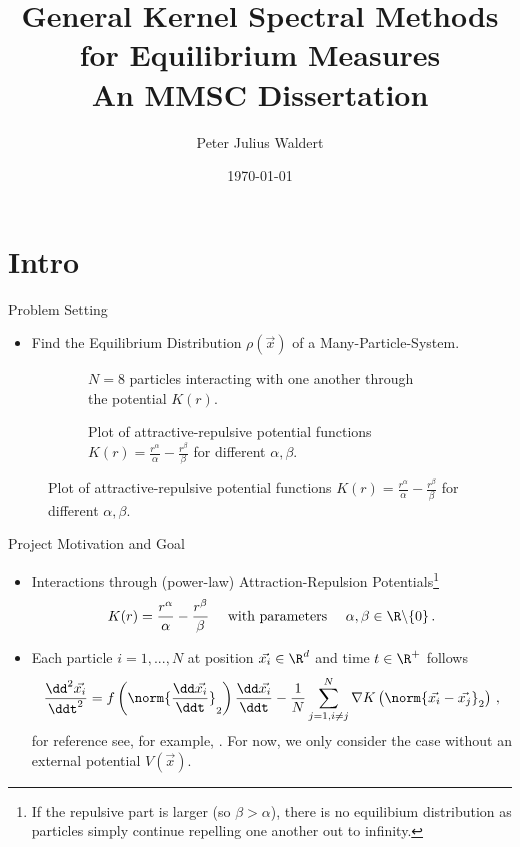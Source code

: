 \documentclass[aspectratio=169, hyperref={colorlinks=true}]{beamer}
\title{General Kernel Spectral Methods for Equilibrium Measures \\ \normalsize An MMSC Dissertation}
\author{Peter Julius Waldert}
\institute{Mathematical Institute \\ University of Oxford}
\date{\today}
\begin{document}
  {\frame{\titlepage}}

  \section{Intro}
  \begin{frame}{Problem Setting}
    \begin{itemize}
      \item Find the Equilibrium Distribution $\rho(\vec{x})$ of a Many-Particle-System.
    \end{itemize}
    \begin{figure}[H]
      \centering
      \begin{subfigure}[t]{0.5\textwidth}
        \centering
        \caption*{$N = 8$ particles interacting with one another through the potential $K(r)$.}
      \end{subfigure}
      \hfill
      \begin{subfigure}[t]{0.49\textwidth}
        \centering
        \caption*{Plot of attractive-repulsive potential functions $K(r) = \frac{r^\alpha}{\alpha} - \frac{r^\beta}{\beta}$ for different $\alpha, \beta$.}
      \end{subfigure}
    \end{figure}
  \end{frame}

  {
  \begin{frame}{Project Motivation and Goal}
    \vspace{0.4cm}
    \begin{itemize}
      \item Interactions through (power-law) Attraction-Repulsion Potentials\footnote{If the repulsive part is larger (so $\beta > \alpha$), there is no equilibium distribution as particles simply continue repelling one another out to infinity.}
            $$K(r) = \frac{r^\alpha}{\alpha} - \frac{r^\beta}{\beta}\quad \text{ with parameters } \quad \alpha, \beta \in \R \backslash \{0\}\,.$$
      \item Each particle $i=1, ..., N$ at position $\vec{x_i} \in \R^d$ and time $t \in \R^+$ follows
            $$\frac{\dd^2 \vec{x_i}}{\ddt^2} = f\left(\norm{\frac{\dd \vec{x_i}}{\ddt}}_2\right) \frac{\dd\vec{x_i}}{\ddt} - \frac{1}{N} \sum_{j=1, i\neq j}^{N} \nabla K\left(\norm{\vec{x_i} - \vec{x_j}}_2\right)\,,$$
            for reference see, for example, \parencite{2020-power-law-kernels, 2021-arbitrary-dimensions}.
            For now, we only consider the case without an external potential $V(\vec{x})$.
    \end{itemize}
  \end{frame}
  }
\end{document}
